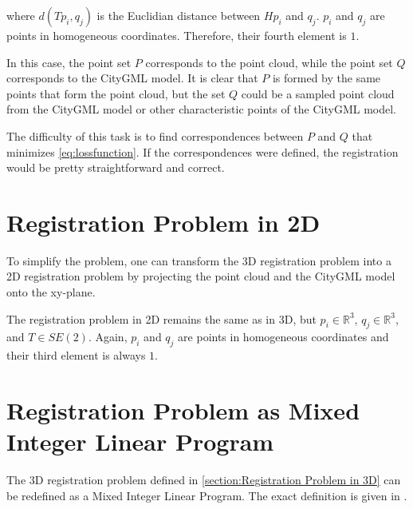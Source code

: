         where $d(T p_i, q_j)$ is the Euclidian distance between $H p_i$ and $q_j$.
        $p_i$ and $q_j$ are points in homogeneous coordinates. Therefore, their fourth element is $1$.

        In this case, the point set $P$ corresponds to the point cloud, while the point set $Q$ corresponds to the CityGML model.
        It is clear that $P$ is formed by the same points that form the point cloud, 
        but the set $Q$ could be a sampled point cloud from the CityGML model
        or other characteristic points of the CityGML model.
        
        The difficulty of this task is to find correspondences between $P$ and $Q$ that minimizes \autoref{eq:lossfunction}.
        If the correspondences were defined, the registration would be pretty straightforward and correct.

    \section{Registration Problem in 2D}
    \label{section:Registration Problem in 2D}
        To simplify the problem, one can transform the 3D registration problem into a 2D registration problem 
        by projecting the point cloud and the CityGML model onto the xy-plane.

        The registration problem in 2D remains the same as in 3D, but $p_i \in \mathbb{R}^{3}$, $q_j \in \mathbb {R}^{3}$, and $T \in SE(2)$.
        Again, $p_i$ and $q_j$ are points in homogeneous coordinates and their third element is always $1$.

    \section{Registration Problem as Mixed Integer Linear Program}
    \label{section:Registration Problem as Mixed Integer Linear Program}
        The 3D registration problem defined in \autoref{section:Registration Problem in 3D} can be redefined as a Mixed Integer Linear Program.
        The exact definition is given in \cite{Sakakubara_2007_automatic}.

